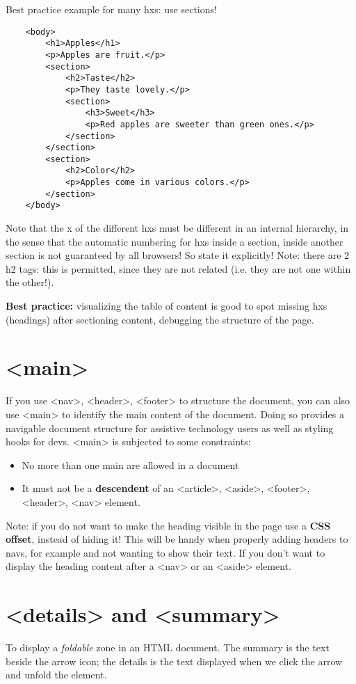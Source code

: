 \documentclass[a4paper,11pt]{book}
\begin{document}
    Best practice example for many hxs: use sections!
    \begin{verbatim}
    <body>
        <h1>Apples</h1>
        <p>Apples are fruit.</p>
        <section>
            <h2>Taste</h2>
            <p>They taste lovely.</p>
            <section>
                <h3>Sweet</h3>
                <p>Red apples are sweeter than green ones.</p>
            </section>
        </section>
        <section>
            <h2>Color</h2>
            <p>Apples come in various colors.</p>
        </section>
    </body>
    \end{verbatim}

    Note that the x of the different hxs must be different in an internal hierarchy,
    in the sense that the automatic numbering for hxs inside a section, inside another
    section is not guaranteed by all browsers! So state it explicitly!
    Note: there are 2 h2 tags: this is permitted, since they are not related (i.e.
    they are not one within the other!).

    \textbf{Best practice:} visualizing the table of content is good to spot missing hxs (headings)
    after sectioning content, debugging the structure of the page.

    \section{<main>}
    If you use <nav>, <header>, <footer> to structure the document, you can also use <main> to
    identify the main content of the document. Doing so provides a navigable document structure
    for assistive technology users as well as styling hooks for devs.
    <main> is subjected to some constraints:
    \begin{itemize}
        \item No more than one main are allowed in a document
        \item It must not be a \textbf{descendent} of an <article>, <aside>, <footer>, <header>, <nav> element.
    \end{itemize}
    
    Note: if you do not want to make the heading visible in the page use a \textbf{CSS offset}, instead of
    hiding it! This will be handy when properly adding headers to navs, for example and not wanting to
    show their text. If you don't want to display the heading content after a <nav> or an <aside> element.

    \section{<details> and <summary>}
    To display a \emph{foldable} zone in an HTML document.
    The summary is the text beside the arrow icon; the details is the text displayed when we click the arrow
    and unfold the element.
\end{document}
